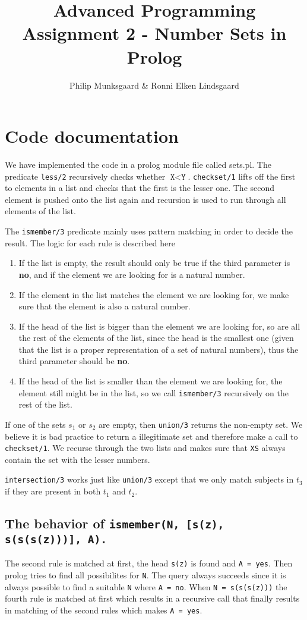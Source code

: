 \documentclass{article}
\title{Advanced Programming Assignment 2 - Number Sets in Prolog}
\author{Philip Munksgaard \& Ronni Elken Lindsgaard}
\newcommand{\prolog}[1]{\texttt{#1}}
\newcommand{\direction}[1]{\textbf{#1}}
\begin{document}
\maketitle
\section{Code documentation}
We have implemented the code in a prolog module file called sets.pl. The
predicate \prolog{less/2} recursively checks whether $\prolog{X} < \prolog{Y}$.
\prolog{checkset/1} lifts off the first to elements in a list and checks that
the first is the lesser one. The second element is pushed onto the list again
and recursion is used to run through all elements of the list.

The \prolog{ismember/3} predicate mainly uses pattern matching in order to
decide the result. The logic for each rule is described here
\begin{enumerate}
  \item If the list is empty, the result should only be true if the third
    parameter is \direction{no}, and if the element we are looking for is a natural number.
  \item If the element in the list matches the element we are looking for, we
    make sure that the element is also a natural number.
  \item If the head of the list is bigger than the element we are
    looking for, so are all the rest of the elements of the list,
    since the head is the smallest one (given that the list is a
    proper representation of a set of natural numbers), thus the third
    parameter should be \direction{no}.
  \item If the head of the list is smaller than the element we are
    looking for, the element still might be in the list, so we call
    \prolog{ismember/3} recursively on the rest of the list.
\end{enumerate}

If one of the sets $s_1$ or $s_2$ are empty, then \prolog{union/3} returns the
non-empty set. We believe it is bad practice to return a illegitimate set and
therefore make a call to \prolog{checkset/1}.
We recurse through the two lists and makes sure that \prolog{XS} always contain
the set with the lesser numbers.

\prolog{intersection/3} works just like \prolog{union/3} except that we only
match subjects in $t_3$ if they are present in both $t_1$ and $t_2$.

\subsection{The behavior of \prolog{ismember(N, [s(z), s(s(s(z)))], A).}}
The second rule is matched at first, the head \prolog{s(z)} is found and
\prolog{A = yes}. Then prolog tries to find all possibilites for \prolog{N}. The
query always succeeds since it is always possible to find a suitable \prolog{N}
where \prolog{A = no}. When \prolog{N = s(s(s(z)))} the fourth rule is matched
at first which results in a recursive call that finally results in matching of
the second rules which makes \prolog{A = yes}.
\end{document}
